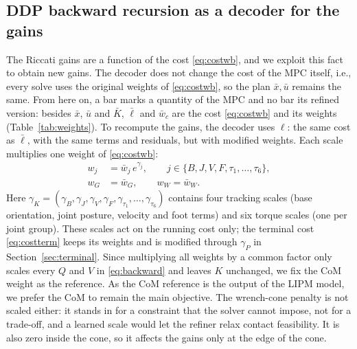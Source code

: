 \documentclass[conference]{IEEEtran}
\newcommand{\xb}{\bar{x}}
\newcommand{\ub}{\bar{u}}
\begin{document}
\subsection{DDP backward recursion as a decoder for the gains}
The Riccati gains are a function of the cost \eqref{eq:costwb}, and we exploit this fact to obtain new gains.
The decoder does not change the cost of the MPC itself, i.e., every solve uses the original weights of \eqref{eq:costwb}, so the plan $\xb,\ub$ remains the same.
From here on, a bar marks a quantity of the MPC and no bar its refined version: besides $\xb$, $\ub$ and $\bar K$, $\bar\ell$ and $\bar w_c$ are the cost \eqref{eq:costwb} and its weights (Table~\ref{tab:weights}). To recompute the gains, the decoder uses $\ell$: the same cost as $\bar\ell$, with the same terms and residuals, but with modified weights.
Each scale multiplies one weight of \eqref{eq:costwb}:
\begin{align}
w_j&=\bar w_j\,e^{\gamma_j},\qquad j\in\{B,J,V,F,\tau_1,\dots,\tau_6\},\label{eq:scale}\\
w_G&=\bar w_G,\qquad w_W=\bar w_W.\label{eq:scaleG}
\end{align}
Here $\gamma_K=(\gamma_B,\gamma_J,\gamma_V,\gamma_F,\gamma_{\tau_1},\dots,\gamma_{\tau_6})$ contains four tracking scales (base orientation, joint posture, velocity and foot terms) and six torque scales (one per joint group).
These scales act on the running cost only; the terminal cost \eqref{eq:costterm} keeps its weights and is modified through $\gamma_P$ in Section~\ref{sec:terminal}.
Since multiplying all weights by a common factor only scales every $Q$ and $V$ in \eqref{eq:backward} and leaves $K$ unchanged, we fix the CoM weight as the reference. As the CoM reference is the output of the LIPM model, we prefer the CoM to remain the main objective. The wrench-cone penalty is not scaled either: it stands in for a constraint that the solver cannot impose, not for a trade-off, and a learned scale would let the refiner relax contact feasibility. It is also zero inside the cone, so it affects the gains only at the edge of the cone.
\end{document}
